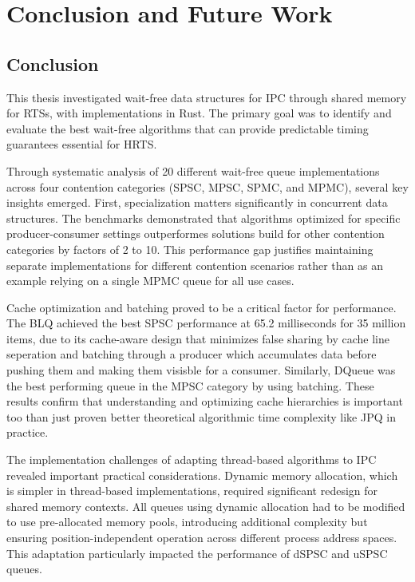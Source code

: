 \chapter{Conclusion and Future Work}\label{ch:conclusion}

\section{Conclusion}

This thesis investigated wait-free data structures for \ac{IPC} through shared memory for \acsp{RTS}, with implementations in Rust. The primary goal was to identify and evaluate the best wait-free algorithms that can provide predictable timing guarantees essential for \ac{HRTS}.

Through systematic analysis of 20 different wait-free queue implementations across four contention categories (\ac{SPSC}, \ac{MPSC}, \ac{SPMC}, and \ac{MPMC}), several key insights emerged. First, specialization matters significantly in concurrent data structures. The benchmarks demonstrated that algorithms optimized for specific producer-consumer settings outperformes solutions build for other contention categories by factors of 2 to 10. This performance gap justifies maintaining separate implementations for different contention scenarios rather than as an example relying on a single \ac{MPMC} queue for all use cases.

Cache optimization and batching proved to be a critical factor for performance. The \acf{BLQ} achieved the best \ac{SPSC} performance at 65.2 milliseconds for 35 million items, due to its cache-aware design that minimizes false sharing by cache line seperation and batching through a producer which accumulates data before pushing them and making them visisble for a consumer. Similarly, DQueue was the best performing queue in the \ac{MPSC} category by using batching. These results confirm that understanding and optimizing cache hierarchies is important too than just proven better theoretical algorithmic time complexity like \ac{JPQ} in practice.

The implementation challenges of adapting thread-based algorithms to \ac{IPC} revealed important practical considerations. Dynamic memory allocation, which is simpler in thread-based implementations, required significant redesign for shared memory contexts. All queues using dynamic allocation had to be modified to use pre-allocated memory pools, introducing additional complexity but ensuring position-independent operation across different process address spaces. This adaptation particularly impacted the performance of \ac{dSPSC} and \ac{uSPSC} queues.

